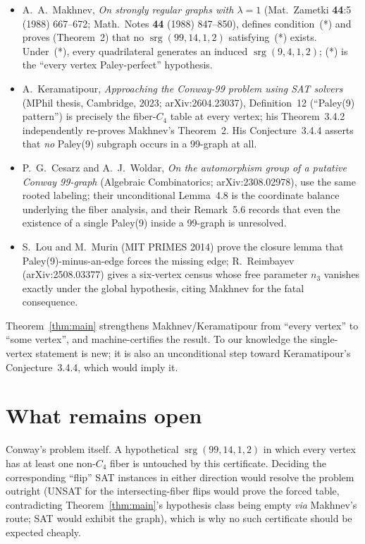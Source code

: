 \documentclass[11pt]{article}
\begin{document}
\begin{itemize}
\item A.~A.~Makhnev, \emph{On strongly regular graphs with \(\lambda=1\)}
(Mat.\ Zametki \textbf{44}:5 (1988) 667--672; Math.\ Notes \textbf{44} (1988)
847--850), defines condition~(*) and proves (Theorem~2) that no
\(\operatorname{srg}(99,14,1,2)\) satisfying~(*) exists.  Under~(*), every
quadrilateral generates an induced \(\operatorname{srg}(9,4,1,2)\); (*) is
the ``every vertex Paley-perfect'' hypothesis.
\item A.~Keramatipour, \emph{Approaching the Conway-99 problem using SAT
solvers} (MPhil thesis, Cambridge, 2023; arXiv:2604.23037), Definition~12
(``Paley(9) pattern'') is precisely the fiber-\(C_4\) table at every vertex;
his Theorem~3.4.2 independently re-proves Makhnev's Theorem~2.  His
Conjecture~3.4.4 asserts that \emph{no} Paley(9) subgraph occurs in a
99-graph at all.
\item P.~G.~Cesarz and A.~J.~Woldar, \emph{On the automorphism group of a
putative Conway 99-graph} (Algebraic Combinatorics; arXiv:2308.02978), use
the same rooted labeling; their unconditional Lemma~4.8 is the coordinate
balance underlying the fiber analysis, and their Remark~5.6 records that even
the existence of a single Paley(9) inside a 99-graph is unresolved.
\item S.~Lou and M.~Murin (MIT PRIMES 2014) prove the closure lemma that
Paley(9)-minus-an-edge forces the missing edge; R.~Reimbayev
(arXiv:2508.03377) gives a six-vertex census whose free parameter \(n_3\)
vanishes exactly under the global hypothesis, citing Makhnev for the fatal
consequence.
\end{itemize}

Theorem~\ref{thm:main} strengthens Makhnev/Keramatipour from ``every vertex''
to ``some vertex'', and machine-certifies the result.  To our knowledge the
single-vertex statement is new; it is also an unconditional step toward
Keramatipour's Conjecture~3.4.4, which would imply it.

\section{What remains open}

Conway's problem itself.  A hypothetical
\(\operatorname{srg}(99,14,1,2)\) in which every vertex has at least one
non-\(C_4\) fiber is untouched by this certificate.  Deciding the
corresponding ``flip'' SAT instances in either direction would resolve the
problem outright (UNSAT for the intersecting-fiber flips would prove the
forced table, contradicting Theorem~\ref{thm:main}'s hypothesis class being
empty \emph{via} Makhnev's route; SAT would exhibit the graph), which is why
no such certificate should be expected cheaply.
\end{document}
